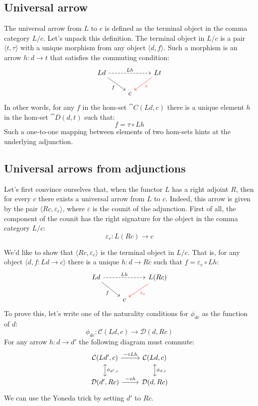 \documentclass[DaoFP]{subfiles}
\begin{document}
\subsection{Universal arrow}

The universal arrow from $L$ to $c$ is defined as the terminal object in the comma category $L / c$. Let's unpack this definition. The terminal object in $L/c$ is a pair $\langle t, \tau \rangle$ with a unique morphism from any object $\langle d, f \rangle$. Such a morphism is an arrow $h \colon d \to t$ that satisfies the commuting condition:
\[
 \begin{tikzcd}
 L d
 \arrow[rd, "f"']
 \arrow[rr, dashed, "L h"]
 && L t
 \arrow[ld, red, "\tau"]
 \\
 &c
  \end{tikzcd}
\]
In other words, for any $f$ in the hom-set $\cat C (L d, c)$ there is a unique element $h$ in the hom-set $\cat D (d, t)$ such that:
\[ f = \tau \circ L h \]
Such a one-to-one mapping between elements of two hom-sets hints at the underlying adjunction. 

\subsection{Universal arrows from adjunctions}

Let's first convince ourselves that, when the functor $L$ has a right adjoint $R$, then for every $c$ there exists a universal arrow from $L$ to $c$. Indeed, this arrow is given by the pair $\langle R c, \varepsilon_c \rangle$, where $\varepsilon$ is the counit of the adjunction. First of all, the component of the counit has the right signature for the object in the comma category $L/c$:
\[ \varepsilon_c \colon L (R c) \to c \]

We'd like to show that $\langle R c, \varepsilon_c \rangle$ is the terminal object in $L/c$. That is, for any object $\langle d, f \colon L d \to c \rangle$ there is a unique $h \colon d \to R c$ such that $f = \varepsilon_c \circ L h$:
\[
 \begin{tikzcd}
 L d
 \arrow[rd, "f"']
 \arrow[rr, dashed, "L h"]
 && L (R c)
 \arrow[ld, red, "\varepsilon_c"]
 \\
 &c
  \end{tikzcd}
\]
To prove this, let's write one of the naturality conditions for $\phi_{d c}$ as the function of $d$:
\[  \phi_{d c} \colon \mathcal{C} (L d, c) \to \mathcal{D}( d , R c)\]
For any arrow $h \colon d \to d'$ the following diagram must commute:
\[
 \begin{tikzcd}
 \mathcal{C}(L d', c)
 \arrow[d, leftrightarrow, "\phi_{d', c}"]
 \arrow[r, "- \circ L h"]
 &
 \mathcal{C}(L d, c)
  \arrow[d, leftrightarrow, "\phi_{d, c}"]
 \\
 \mathcal{D}(d', R c)
 \arrow[r, "- \circ h"]
& \mathcal{D}(d, R c)
 \end{tikzcd}
\]
We can use the Yoneda trick by setting $d'$ to $R c$.
\end{document}
